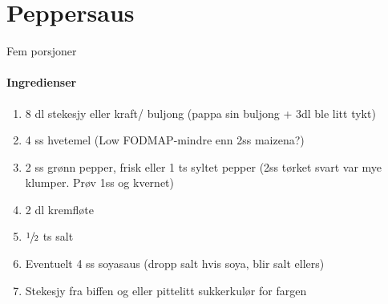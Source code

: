 \section{Peppersaus}
\label{peppersaus}
Fem porsjoner

\paragraph{Ingredienser}
\begin{enumerate}[noitemsep]
  \item 8 dl stekesjy eller kraft/ buljong (pappa sin buljong + 3dl ble litt tykt)
  \item 4 ss hvetemel (Low FODMAP-mindre enn 2ss maizena?)
  \item 2 ss grønn pepper, frisk eller 1 ts syltet pepper (2ss tørket svart var mye klumper.  Prøv 1ss og kvernet)
  \item 2 dl kremfløte
  \item  $\sfrac{1}{2}$  ts salt
  \item Eventuelt 4 ss soyasaus (dropp salt hvis soya, blir salt ellers)
  \item Stekesjy fra biffen og eller pittelitt sukkerkulør for fargen
\end{enumerate}
